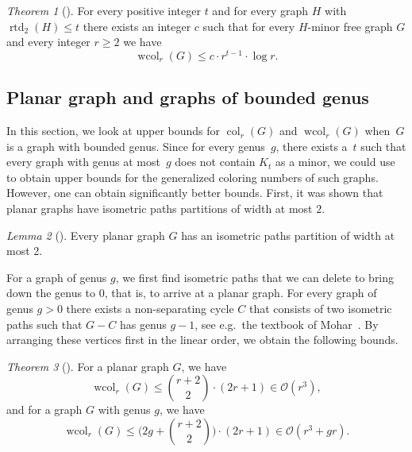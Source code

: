 \documentclass[1p,number,a4paper]{elsarticle}
\theoremstyle{remark}
\newcommand{\Oof}{\mathcal{O}}
\DeclareMathOperator{\rtd}{rtd}
\DeclareMathOperator{\col}{col}
\DeclareMathOperator{\wcol}{wcol}
\newtheorem{theorem}{Theorem}[section]
\newtheorem{lemma}[theorem]{Lemma}
\begin{document}
\begin{theorem}[\cite{hodor2024weak}]
    For every positive integer $t$ and for every graph $H$ with $\rtd_2(H)\leq t$ there exists an integer $c$ such that for every $H$-minor free graph $G$ and every integer $r\geq 2$ we have \[\wcol_r(G)\leq c\cdot r^{t-1}\cdot \log r.\]
\end{theorem}

\subsection{Planar graph and graphs of bounded genus}
\label{sec:wcolplanar}

In this section, we look at upper bounds for
$\col_r(G)$ and $\wcol_r(G)$ when~$G$ is a graph with bounded genus. 
Since for every genus~$g$, there exists a~$t$ such that every graph with genus at
most~$g$ does not contain $K_t$ as a minor, we could use
 to obtain upper bounds for the generalized coloring
numbers of such graphs. However, one can obtain significantly better bounds. 
First, it was shown that planar graphs have isometric paths partitions of width 
at most $2$. 

\begin{lemma}[\cite{van2017generalised}]\label{lem:wcolplanar}
  Every planar graph $G$ has an isometric paths partition of
  width at most 2.
\end{lemma}

For a graph of genus $g$, we first find isometric paths that we can delete to bring down the genus to $0$, that is, to arrive at a planar graph. For every graph of genus $g>0$ there exists a non-separating cycle $C$ that consists of two isometric paths such that $G-C$ has genus $g-1$, see e.g.\ the textbook of Mohar~\cite{mohar2001graphs}. By arranging these vertices first in the linear order, we obtain the following bounds. 



\begin{theorem}[\cite{van2017generalised}]\label{thm:wcol-planar}
  For a planar graph $G$, we have
  \begin{equation*}
   \wcol_r(G)\le \binom{r+2}{2}\cdot(2r+1)\in \Oof(r^3),
  \end{equation*}
  and for a graph $G$ with genus $g$, we have
  \begin{equation*}
   \wcol_r(G)\le \biggl(2g+\binom{r+2}{2}\biggr)\cdot(2r+1)\in \Oof(r^3+gr).
  \end{equation*}
\end{theorem}
\end{document}
